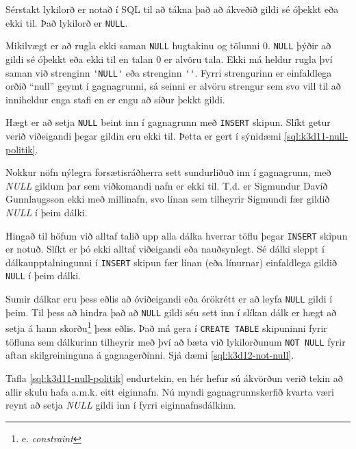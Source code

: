 Sérstakt lykilorð er notað í SQL til að tákna það að ákveðið gildi sé óþekkt eða ekki til. Það lykilorð er \verb|NULL|.

Mikilvægt er að rugla ekki saman \verb|NULL| hugtakinu og tölunni $0$. \verb|NULL| þýðir að gildi sé óþekkt eða ekki til en talan $0$ er alvöru tala. Ekki má heldur rugla því saman við strenginn \verb|'NULL'| eða strenginn \verb|''|. Fyrri strengurinn er einfaldlega orðið ``null'' geymt í gagnagrunni, sá seinni er alvöru strengur sem svo vill til að inniheldur enga stafi en er engu að síður þekkt gildi.

Hægt er að setja \verb|NULL| beint inn í gagnagrunn með \verb|INSERT| skipun. Slíkt getur verið viðeigandi þegar gildin eru ekki til. Þetta er gert í sýnidæmi \ref{sql:k3d11-null-politik}.

\begin{example}
\caption[Mannanöfn]{Nokkur nöfn nýlegra forsætisráðherra sett sundurliðuð inn í gagnagrunn, með \emph{NULL} gildum þar sem viðkomandi nafn er ekki til. T.d. er Sigmundur Davíð Gunnlaugsson ekki með millinafn, svo línan sem tilheyrir Sigmundi fær gildið \emph{NULL} í þeim dálki.}
\label{sql:k3d11-null-politik}
\centering
{}
\end{example}

Hingað til höfum við alltaf talið upp alla dálka hverrar töflu þegar \verb|INSERT| skipun er notuð. Slíkt er þó ekki alltaf viðeigandi eða nauðsynlegt. Sé dálki sleppt í dálkaupptalningunni í \verb|INSERT| skipun fær línan (eða línurnar) einfaldlega gildið \verb|NULL| í þeim dálki.

Sumir dálkar eru þess eðlis að óviðeigandi eða órökrétt er að leyfa \verb|NULL| gildi í þeim. Til þess að hindra það að \verb|NULL| gildi séu sett inn í slíkan dálk er hægt að setja á hann skorðu\footnote{e. \emph{constraint}} þess eðlis. Það má gera í \verb|CREATE TABLE| skipuninni fyrir töfluna sem dálkurinn tilheyrir með því að bæta við lykilorðunum \verb|NOT NULL| fyrir aftan skilgreininguna á gagnagerðinni. Sjá dæmi \ref{sql:k3d12-not-null}.

\begin{example}
\caption[NOT NULL]{Tafla \ref{sql:k3d11-null-politik} endurtekin, en hér hefur sú ákvörðun verið tekin að allir skulu hafa a.m.k. eitt eiginnafn. Nú myndi gagnagrunnskerfið kvarta væri reynt að setja \emph{NULL} gildi inn í fyrri eiginnafnsdálkinn.}
\label{sql:k3d12-not-null}
\centering
{}
\end{example}

